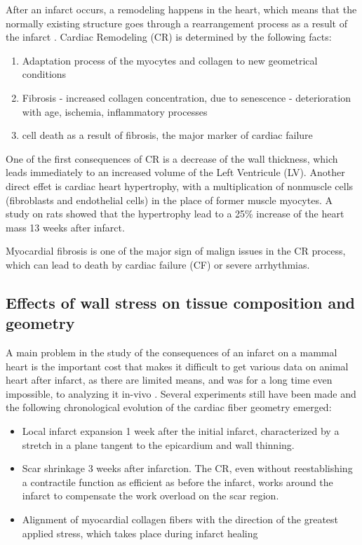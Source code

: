After an infarct occurs, a remodeling happens in the heart, which means that the normally existing structure goes through a rearrangement process as a result of the infarct \cite{swynghedauw1999molecular}. Cardiac Remodeling (CR) is determined by the following facts:
\begin{enumerate}
    \item Adaptation process of the myocytes and collagen to new geometrical conditions
    \item Fibrosis - increased collagen concentration, due to senescence - deterioration with age, ischemia, inflammatory processes
    \item cell death as a result of fibrosis, the major marker of cardiac failure
\end{enumerate}
One of the first consequences of CR is a decrease of the wall thickness, which leads immediately to an increased volume of the Left Ventricule (LV). Another direct effet is cardiac heart hypertrophy, with a multiplication of nonmuscle cells (fibroblasts and endothelial cells) in the place of former muscle myocytes. A study on rats \cite{mccormick1994regional} showed that the hypertrophy lead to a 25\% increase of the heart mass 13 weeks after infarct.

Myocardial fibrosis is one of the major sign of malign issues in the CR process, which can lead to death by cardiac failure (CF) or severe arrhythmias.

\subsection{Effects of wall stress on tissue composition and geometry}

A main problem in the study of the consequences of an infarct on a mammal heart is the important cost that makes it difficult to get various data on animal heart after infarct, as there are limited means,  and was for a long time even impossible, to analyzing it in-vivo \cite{holmes1994scar}. Several experiments still have been made and the following chronological evolution of the cardiac fiber geometry emerged:
\begin{itemize}
    \item Local infarct expansion 1 week after the initial infarct, characterized by a stretch in a plane tangent to the epicardium and wall thinning.
    \item Scar shrinkage 3 weeks after infarction. The CR, even without reestablishing a contractile function as efficient as before the infarct, works around the infarct to compensate the work overload on the scar region.
    \item Alignment of myocardial collagen fibers with the direction of the greatest applied stress, which takes place during infarct healing
\end{itemize}

